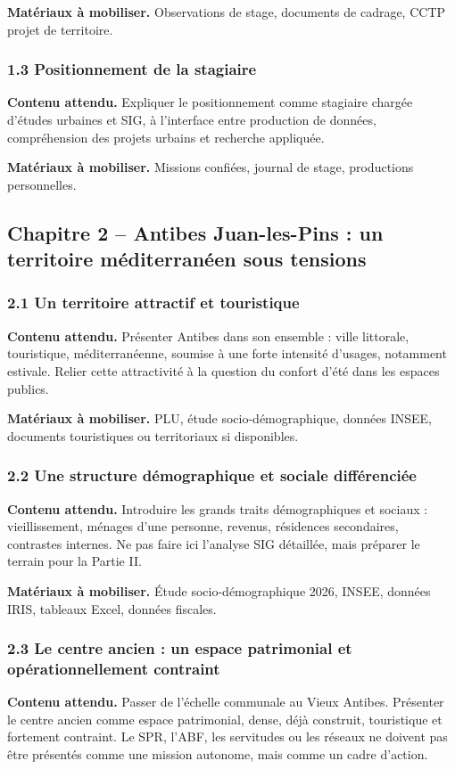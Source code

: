 \documentclass[11pt,a4paper]{article}
\begin{document}
\textbf{Matériaux à mobiliser.} Observations de stage, documents de cadrage, CCTP projet de territoire.

\subsubsection{1.3 Positionnement de la stagiaire}
\textbf{Contenu attendu.} Expliquer le positionnement comme stagiaire chargée d'études urbaines et SIG, à l'interface entre production de données, compréhension des projets urbains et recherche appliquée.

\textbf{Matériaux à mobiliser.} Missions confiées, journal de stage, productions personnelles.

\subsection{Chapitre 2 -- Antibes Juan-les-Pins : un territoire méditerranéen sous tensions}

\subsubsection{2.1 Un territoire attractif et touristique}
\textbf{Contenu attendu.} Présenter Antibes dans son ensemble : ville littorale, touristique, méditerranéenne, soumise à une forte intensité d'usages, notamment estivale. Relier cette attractivité à la question du confort d'été dans les espaces publics.

\textbf{Matériaux à mobiliser.} PLU, étude socio-démographique, données INSEE, documents touristiques ou territoriaux si disponibles.

\subsubsection{2.2 Une structure démographique et sociale différenciée}
\textbf{Contenu attendu.} Introduire les grands traits démographiques et sociaux : vieillissement, ménages d'une personne, revenus, résidences secondaires, contrastes internes. Ne pas faire ici l'analyse SIG détaillée, mais préparer le terrain pour la Partie II.

\textbf{Matériaux à mobiliser.} Étude socio-démographique 2026, INSEE, données IRIS, tableaux Excel, données fiscales.

\subsubsection{2.3 Le centre ancien : un espace patrimonial et opérationnellement contraint}
\textbf{Contenu attendu.} Passer de l'échelle communale au Vieux Antibes. Présenter le centre ancien comme espace patrimonial, dense, déjà construit, touristique et fortement contraint. Le SPR, l'ABF, les servitudes ou les réseaux ne doivent pas être présentés comme une mission autonome, mais comme un cadre d'action.
\end{document}
